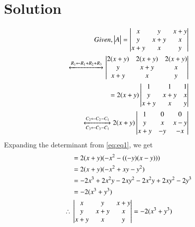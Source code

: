 \documentclass[journal,12pt,twocolumn]{IEEEtran}
\begin{document}
\section{Solution}
\begin{align}
	Given, \begin{vmatrix}A\end{vmatrix} = \begin{vmatrix}x & y & x+y\\ y & x+y & x\\ x+y & x &y\end{vmatrix}\\
	\xleftrightarrow{ R_1 \leftarrow R_1 + R_2 + R_3} \begin{vmatrix}2(x + y) & 2(x + y) & 2(x + y)\\ y & x+y & x\\ x+y & x &y\end{vmatrix}\\
	= 2(x + y)\begin{vmatrix}1 & 1 & 1\\ y & x+y & x\\ x+y & x &y\end{vmatrix}\\
	\xleftrightarrow[C_3 \leftarrow C_3 - C_1]{C_2 \leftarrow C_2 - C_1}
	2(x + y) \begin{vmatrix}1 & 0 & 0\\ y & x & x-y\\ x+y & -y &-x\end{vmatrix}\label{eq:eq1}
\end{align}
Expanding the determinant from \eqref{eq:eq1}, we get
\begin{align}
     &= 2(x + y)(-x^2 - ((-y)(x-y))) \\
     &= 2(x + y)(-x^2 + xy - y^2)\\
     &= -2x^3 + 2x^2y - 2xy^2 - 2x^2y + 2xy^2 - 2y^3\\
     &= -2(x^3 + y^3)\\
     \therefore{}&\begin{vmatrix}x & y & x+y\\ y & x+y & x\\ x+y & x &y\end{vmatrix} = -2(x^3 + y^3)
\end{align}
\end{document}
